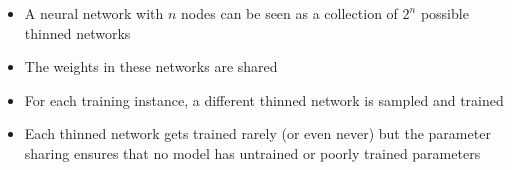 \begin{frame}
	\begin{itemize}
		\justifying
		\item<2-> A neural network with $n$ nodes can be seen as a collection of $2^n$ possible thinned networks
		\item<3-> The weights in these networks are shared
		\item<4-> For each training instance, a different thinned network is sampled and trained
		\item<5-> Each thinned network gets trained rarely (or even never) but the parameter sharing ensures that no model has untrained or poorly trained parameters
	\end{itemize}
							
\end{frame}
					
